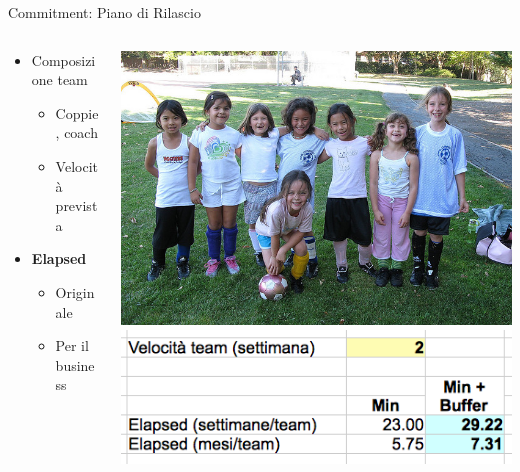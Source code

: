 \documentclass[compress, red, 14pt, pdf]{beamer}
\begin{document}
	\begin{frame}{Commitment: Piano di Rilascio}

		\begin{columns}[T]
		    \begin{column}{.5\textwidth}

				\begin{itemize}
					\item Composizione team
					\begin{itemize}
						\item Coppie, coach
						\item Velocità prevista
					\end{itemize}
				\end{itemize}

				\begin{itemize}
					\item \textbf{Elapsed}
					\begin{itemize}
						\item Originale
						\item Per il business
					\end{itemize}
				\end{itemize}
		
	    	\end{column}
		    \begin{column}{.5\textwidth}
				\hspace*{-0.1cm} \includegraphics[scale=0.55]{images/team}
				\\ \vspace*{0.2cm}
				\hspace*{-0.2cm} \includegraphics[scale=0.35]{images/elapsed}
		    \end{column}
		\end{columns}


\end{frame}
\end{document}
